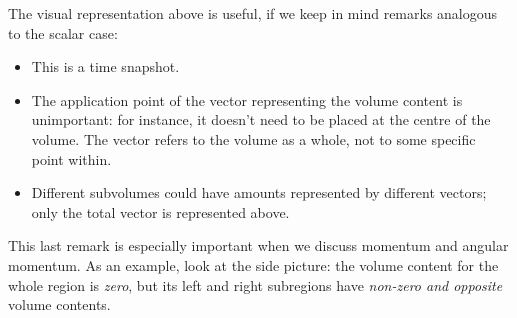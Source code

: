 \documentclass[a4paper,12pt,%
onecolumn,oneside,titlepage,%
british%
]{memoir}
\renewcommand*{\|}[1][]{\nonscript\:#1\vert\nonscript\:\mathopen{}}
\newcommand*{\fig}{fig.}%
\begin{document}
The visual representation above is useful, if we keep in mind remarks analogous to the scalar case:
\begin{itemize}
\item This is a time snapshot.
\item\label{item:applicationpoint}The application point of the vector representing the volume content is unimportant: for instance, it doesn't need to be placed at the centre of the volume. The vector refers to the volume as a whole, not to some specific point within.
\item Different subvolumes could have amounts represented by different vectors; only the total vector is represented above.
\end{itemize}
This last remark is especially important when we discuss momentum and angular momentum. As an example, look at the side picture:%
the volume content for the whole region is \emph{zero}, but its left and right subregions have \emph{non-zero and opposite} volume contents.
\end{document}
